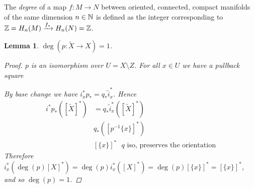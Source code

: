 \documentclass[A4paper, british, reqno]{amsart}
\theoremstyle{darkgreentheorem}
\newtheorem{lm}[thm]{Lemma}
\theoremstyle{darkbluedefinition}
\theoremstyle{darkredexample}
\theoremstyle{remark}
\newcommand{\1}{\mathbbm{1}}
\begin{document}
The \textit{degree} of a map $f\colon M\to N$ between oriented, connected, compact manifolds of the same dimension $n\in \mathbb{N}$ is defined as the integer corresponding to $\mathbb{Z}=H_{n}(M)\xrightarrow{f_{*}} H_{n}(N)=\mathbb{Z}$.

\begin{lm}
    $\deg(p\colon \tilde{X}\to X)=1$.
    \begin{proof}
	$p$ is an isomorphism over $U=X\setminus Z$.
	For all $x\in U$ we have a pullback square
	\begin{center}
	\end{center}
	By base change we have $i_{x}^{*}p_{*}=q_{*}\tilde{i}_{x}^{*}$.
	Hence
	\begin{align*}
	    i^{*}p_{*}([\tilde{X}]^{*}) & =q_{*}\tilde{i}_{x}^{*}([\tilde{X}]^{*}) \\
	     & q_{*}([p^{-1}\{x\}]^{*}) \\
	     & [\{x\}]^{*} \text{ $q$ iso, preserves the orientation}
	\end{align*}
	Therefore $i_{x}^{*}(\deg(p)[X]^{*})=\deg(p)i_{x}^{*}([X]^{*})=\deg(p)[\{x\}]^{*}=[\{x\}]^{*}$, and so $\deg(p)=1$.
    \end{proof}
\end{lm}
\end{document}

